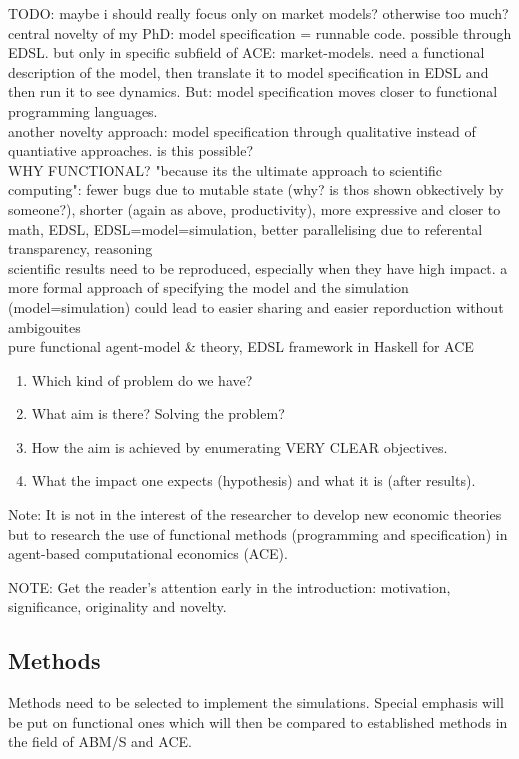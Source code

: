 \documentclass{article}
\begin{document}
TODO: maybe i should really focus only on market models? otherwise too much? \\

central novelty of my PhD: model specification = runnable code. possible through EDSL. but only in specific subfield of ACE: market-models. need a functional description of the model, then translate it to model specification in EDSL and then run it to see dynamics. But: model specification moves closer to functional programming languages. \\

another novelty approach: model specification through qualitative instead of quantiative approaches. is this possible? \\

WHY FUNCTIONAL? "because its the ultimate approach to scientific computing": fewer bugs due to mutable state (why? is thos shown obkectively by someone?), shorter (again as above, productivity), more expressive and closer to math, EDSL, EDSL=model=simulation, better parallelising due to referental transparency, reasoning \\

scientific results need to be reproduced, especially when they have high impact. a more formal approach of specifying the model and the simulation (model=simulation) could lead to easier sharing and easier reporduction without ambigouites \\

pure functional agent-model \& theory, EDSL framework in Haskell for ACE

\begin{enumerate}
\item Which kind of problem do we have?
\item What aim is there? Solving the problem? 
\item How the aim is achieved by enumerating VERY CLEAR objectives.
\item What the impact one expects (hypothesis) and what it is (after results).
\end{enumerate}

Note: It is not in the interest of the researcher to develop new economic theories but to research the use of functional methods (programming and specification) in agent-based computational economics (ACE).

NOTE: Get the reader’s attention early in the introduction: motivation, significance, originality and novelty.

\subsection{Methods}
Methods need to be selected to implement the simulations. Special emphasis will be put on functional ones which will then be compared to established methods in the field of ABM/S and ACE. 
\end{document}
